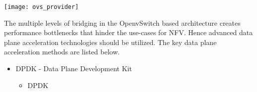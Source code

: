 \begin{enumerate}
\begin{flushleft}
\begin{itemize}
\begin{flushleft}
\texttt{[image: ovs\_provider]}
				
The multiple levels of bridging in the OpenvSwitch based architecture creates performance bottlenecks that hinder the use-cases for NFV. Hence advanced data plane acceleration technologies should be utilized. The key data plane acceleration methods are listed below.
	
\begin{itemize}
\item DPDK - Data Plane Development Kit
\begin{itemize}
\item DPDK
\end{itemize}
\end{itemize} 
\end{flushleft}
				
\end{itemize}
\end{flushleft}
\end{enumerate}
	
